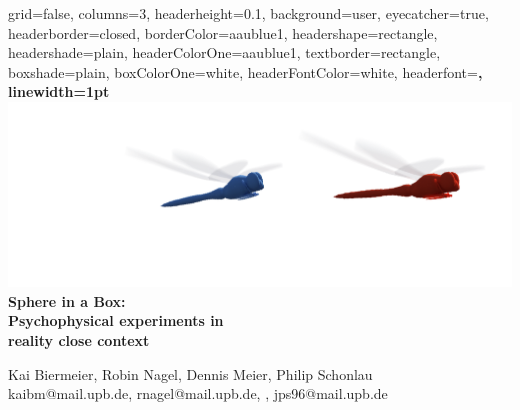 \documentclass[a0paper,portrait]{baposter}
\begin{document}
	
	\begin{poster}{
			grid=false,
			columns=3,
			headerheight=0.1\textheight,
			background=user,
			eyecatcher=true,
			headerborder=closed,
			borderColor=aaublue1,
			headershape=rectangle,
			headershade=plain, %
			headerColorOne=aaublue1,
			textborder=rectangle,
			boxshade=plain,
			boxColorOne=white,
			headerFontColor=white,
			headerfont=\Large\sf\bf,
			linewidth=1pt
		}
		{
			\vspace*{-1cm} \includegraphics[height=.9\headerheight]{UPB_Logo_WEISS_12_libellen2.pdf}
		}
		{\color{white}\bf\smaller
			Sphere in a Box: \\ 
			Psychophysical experiments in \\ reality close context
		}
		{\color{white}\small
			\vspace*{-0.2cm}
			\vspace{1em}Kai Biermeier, Robin Nagel, Dennis Meier, Philip Schonlau\\
			{\smaller kaibm@mail.upb.de, rnagel@mail.upb.de, , jps96@mail.upb.de}
			
}
\end{poster}
\end{document}
